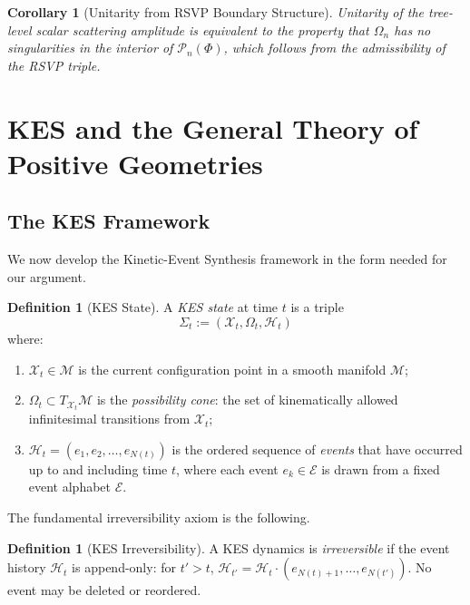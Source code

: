 \documentclass[12pt, oneside]{amsart}
\theoremstyle{plain}
\newtheorem{corollary}[theorem]{Corollary}
\theoremstyle{definition}
\newtheorem{definition}[theorem]{Definition}
\theoremstyle{remark}
\newcommand{\XKS}{\mathcal{X}}
\newcommand{\OmKS}{\Omega}
\newcommand{\HKS}{\mathcal{H}}
\newcommand{\EKS}{\mathcal{E}}
\newcommand{\CF}{\Omega}   %
\begin{document}
\begin{corollary}[Unitarity from RSVP Boundary Structure]
\label{cor:unitarity}
Unitarity of the tree-level scalar scattering amplitude is equivalent to the property that $\CF_n$ has no singularities in the interior of $\mathcal{P}_n(\Phi)$, which follows from the admissibility of the RSVP triple.
\end{corollary}

\section{KES and the General Theory of Positive Geometries}
\label{sec:kes}

\subsection{The KES Framework}

We now develop the Kinetic-Event Synthesis framework in the form needed for our argument.

\begin{definition}[KES State]
\label{def:kes-state}
A \emph{KES state} at time $t$ is a triple
\[
  \Sigma_t := (\XKS_t, \OmKS_t, \HKS_t)
\]
where:
\begin{enumerate}[label=(\roman*)]
  \item $\XKS_t \in \mathcal{M}$ is the current configuration point in a smooth manifold $\mathcal{M}$;
  \item $\OmKS_t \subset T_{\XKS_t}\mathcal{M}$ is the \emph{possibility cone}: the set of kinematically allowed infinitesimal transitions from $\XKS_t$;
  \item $\HKS_t = (e_1, e_2, \ldots, e_{N(t)})$ is the ordered sequence of \emph{events} that have occurred up to and including time $t$, where each event $e_k \in \EKS$ is drawn from a fixed event alphabet $\EKS$.
\end{enumerate}
\end{definition}

The fundamental irreversibility axiom is the following.

\begin{definition}[KES Irreversibility]
\label{def:kes-irreversibility}
A KES dynamics is \emph{irreversible} if the event history $\HKS_t$ is append-only: for $t' > t$, $\HKS_{t'} = \HKS_t \cdot (e_{N(t)+1}, \ldots, e_{N(t')})$. No event may be deleted or reordered.
\end{definition}
\end{document}
